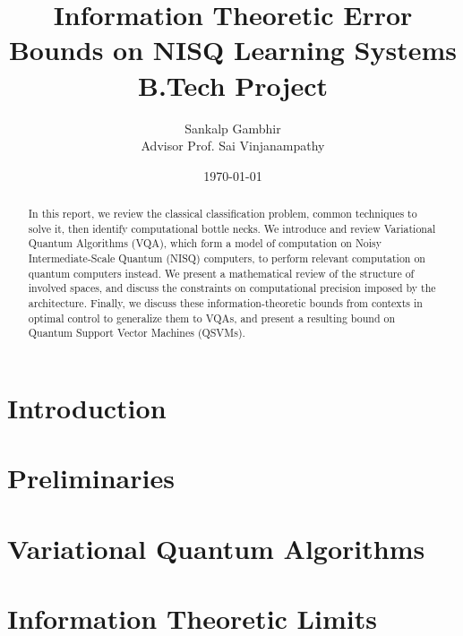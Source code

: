 \documentclass[
    paper=a4, 
    lang=en, 
    font=kpfonts,
    ptsize=12pt,
    titles=bf,
    hanging-titles=true,
    cleanlook, printdayoff, %
    draft %
]
{skrapport}
\title{
    {\huge Information Theoretic Error Bounds on NISQ Learning Systems} \\
    {\large B.Tech Project}
    }
\author[sgambhir@iitb.ac.in]{
    Sankalp Gambhir \\ 
    \vspace{1em}
        {
            \normalsize 
            \hspace{0.1em} 
            Advisor \hspace{0.5em}
            Prof. Sai Vinjanampathy
        }
    \vspace{-1.3em}
}
\date{\today}
\newcounter{notes}
\begin{document}
    \begin{titlepage}
        \maketitle
        \begin{abstract}
            In this report, we review the classical classification problem,
            common techniques to solve it, then identify computational bottle
            necks. We introduce and review Variational Quantum Algorithms (VQA),
            which form a model of computation on Noisy Intermediate-Scale
            Quantum (NISQ) computers, to perform relevant computation on quantum
            computers instead. We present a mathematical review of the structure
            of involved spaces, and discuss the constraints on computational
            precision imposed by the architecture. Finally, we discuss these
            information-theoretic bounds from contexts in optimal control to
            generalize them to VQAs, and present a resulting bound on Quantum
            Support Vector Machines (QSVMs).
        \end{abstract}

        \listofnotes
    \end{titlepage}

    \tableofcontents \pagebreak

    \section{Introduction}
        \label{sec:intro}
        
    
    \section{Preliminaries}
        \label{sec:prelim}
        

    \section{Variational Quantum Algorithms}
        \label{sec:vqa}
        
    
    \section{Information Theoretic Limits}
        \label{sec:infolimits}
        
\end{document}

